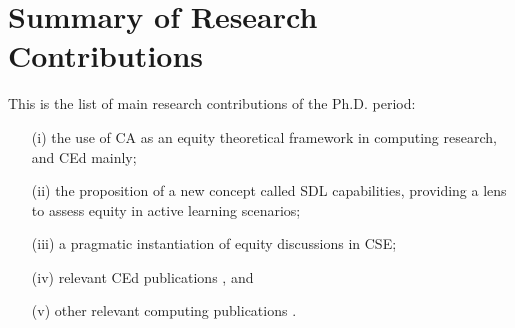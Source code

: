 \section{Summary of Research Contributions}
\label{intro-sec:sum-contributions}

This is the list of main research contributions of the \gls{Ph.D.} period:
\begin{enumerate}
    \item[(i)] the use of \acrfull{CA} as an equity theoretical framework in computing research, and \acrfull{CEd} mainly;
    \item[(ii)] the proposition of a new concept called \acrfull{SDL} capabilities, providing a lens to assess equity in active learning scenarios;
    \item[(iii)] a pragmatic instantiation of equity discussions in \acrfull{CSE};
    \item[(iv)] relevant \gls{CEd} publications \cite{bispojr:2024-isdls,bispojr:2024-nmp,bispojr:2024-urca,   feitosa:2024,cavalcanti:2024,pereira:2024,melo:2024-horizontes,boaventura:2024-sbgames,boaventura:2023,esmeraldo:2023,freire:2023-rsc,freire:2023-encompif, santos:2022,bispojr:2022-educomp,esmeraldo:2022,bispojr:2021,bispojr:2021-educomp,bispojr:2021-wei,bispojr:2020-tec}, and
    \item[(v)] other relevant computing publications \cite{bispojr:2024-online-lab,cavalcanti:2024-ieee,bispojr:2023-edi,bispojr:2023-rbie,sansil:2023,bispojr:2022-snee,lima:2022}.
\end{enumerate}

                

        

        
